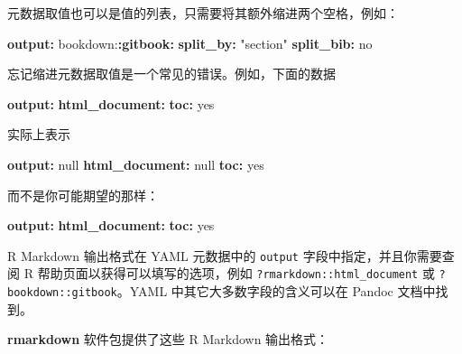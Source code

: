 \documentclass[
  12pt,
]{krantz}
\newenvironment{Shaded}{\begin{snugshade}}{\end{snugshade}}
\newcommand{\AttributeTok}[1]{\textcolor[rgb]{0.13,0.29,0.53}{#1}}
\newcommand{\CharTok}[1]{\textcolor[rgb]{0.31,0.60,0.02}{#1}}
\newcommand{\FunctionTok}[1]{\textcolor[rgb]{0.13,0.29,0.53}{\textbf{#1}}}
\newcommand{\KeywordTok}[1]{\textcolor[rgb]{0.13,0.29,0.53}{\textbf{#1}}}
\newcommand{\StringTok}[1]{\textcolor[rgb]{0.31,0.60,0.02}{#1}}
\theoremstyle{definition}
\theoremstyle{definition}
\theoremstyle{definition}
\theoremstyle{definition}
\theoremstyle{remark}
\begin{document}
元数据取值也可以是值的列表，只需要将其额外缩进两个空格，例如：

\begin{Shaded}
\begin{Highlighting}[]
\FunctionTok{output}\KeywordTok{:}
\AttributeTok{  bookdown:}\FunctionTok{:gitbook}\KeywordTok{:}
\AttributeTok{    }\FunctionTok{split\_by}\KeywordTok{:}\AttributeTok{ }\StringTok{"section"}
\AttributeTok{    }\FunctionTok{split\_bib}\KeywordTok{:}\AttributeTok{ }\CharTok{no}
\end{Highlighting}
\end{Shaded}

忘记缩进元数据取值是一个常见的错误。例如，下面的数据

\begin{Shaded}
\begin{Highlighting}[]
\FunctionTok{output}\KeywordTok{:}
\FunctionTok{html\_document}\KeywordTok{:}
\FunctionTok{toc}\KeywordTok{:}\AttributeTok{ }\CharTok{yes}
\end{Highlighting}
\end{Shaded}

实际上表示

\begin{Shaded}
\begin{Highlighting}[]
\FunctionTok{output}\KeywordTok{:}\AttributeTok{ }\CharTok{null}
\FunctionTok{html\_document}\KeywordTok{:}\AttributeTok{ }\CharTok{null}
\FunctionTok{toc}\KeywordTok{:}\AttributeTok{ }\CharTok{yes}
\end{Highlighting}
\end{Shaded}

而不是你可能期望的那样：

\begin{Shaded}
\begin{Highlighting}[]
\FunctionTok{output}\KeywordTok{:}
\AttributeTok{  }\FunctionTok{html\_document}\KeywordTok{:}
\AttributeTok{    }\FunctionTok{toc}\KeywordTok{:}\AttributeTok{ }\CharTok{yes}
\end{Highlighting}
\end{Shaded}

R Markdown 输出格式在 YAML 元数据中的 \texttt{output} 字段中指定，并且你需要查阅 R 帮助页面以获得可以填写的选项，例如 \texttt{?rmarkdown::html\_document} 或 \texttt{?bookdown::gitbook}。YAML 中其它大多数字段的含义可以在 Pandoc 文档中找到。

\textbf{rmarkdown} 软件包提供了这些 R Markdown 输出格式：
\end{document}
